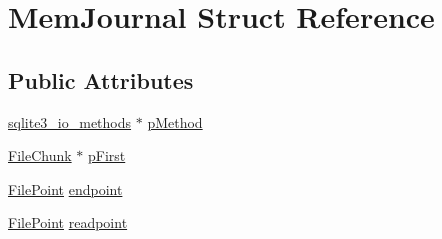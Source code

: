 \hypertarget{struct_mem_journal}{\section{Mem\-Journal Struct Reference}
\label{struct_mem_journal}
}
\subsection*{Public Attributes}
\begin{DoxyCompactItemize}
\item 
\hyperlink{structsqlite3__io__methods}{sqlite3\-\_\-io\-\_\-methods} $\ast$ \hyperlink{struct_mem_journal_a00c1523cce1bcfadc2b672b8703a78cb}{p\-Method}
\item 
\hyperlink{struct_file_chunk}{File\-Chunk} $\ast$ \hyperlink{struct_mem_journal_ade7a6dea7b38a8a86f33476ae207765f}{p\-First}
\item 
\hyperlink{struct_file_point}{File\-Point} \hyperlink{struct_mem_journal_ac69637f95cfbce175cbeef00f71e59a9}{endpoint}
\item 
\hyperlink{struct_file_point}{File\-Point} \hyperlink{struct_mem_journal_a5645d38e1a488b62b5f63112628bf472}{readpoint}
\end{DoxyCompactItemize}


